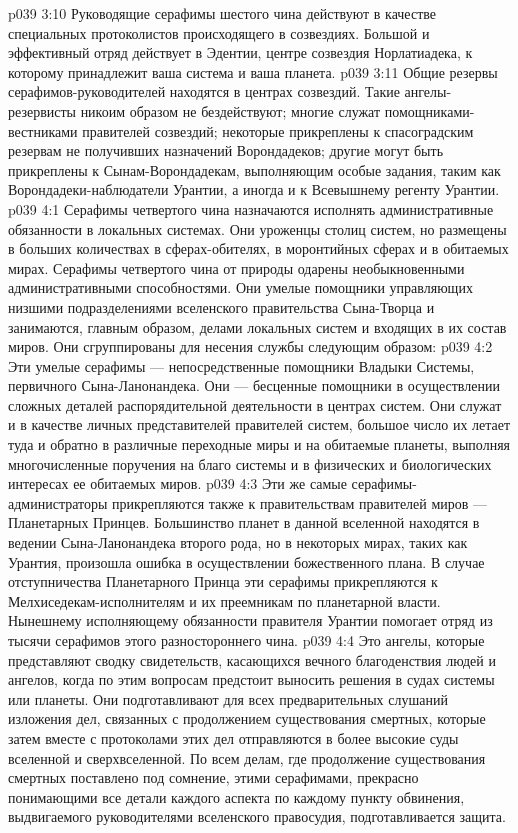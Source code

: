 \vs p039 3:10 \bibnobreakspace {} Руководящие серафимы шестого чина действуют в качестве специальных протоколистов происходящего в созвездиях. Большой и эффективный отряд действует в Эдентии, центре созвездия Норлатиадека, к которому принадлежит ваша система и ваша планета.
\vs p039 3:11 \bibnobreakspace {} Общие резервы серафимов\hyp{}руководителей находятся в центрах созвездий. Такие ангелы\hyp{}резервисты никоим образом не бездействуют; многие служат помощниками\hyp{}вестниками правителей созвездий; некоторые прикреплены к спасоградским резервам не получивших назначений Ворондадеков; другие могут быть прикреплены к Сынам\hyp{}Ворондадекам, выполняющим особые задания, таким как Ворондадеки\hyp{}наблюдатели Урантии, а иногда и к Всевышнему регенту Урантии.
\vs p039 4:1 Серафимы четвертого чина назначаются исполнять административные обязанности в локальных системах. Они уроженцы столиц систем, но размещены в больших количествах в сферах\hyp{}обителях, в моронтийных сферах и в обитаемых мирах. Серафимы четвертого чина от природы одарены необыкновенными административными способностями. Они умелые помощники управляющих низшими подразделениями вселенского правительства Сына\hyp{}Творца и занимаются, главным образом, делами локальных систем и входящих в их состав миров. Они сгруппированы для несения службы следующим образом:
\vs p039 4:2 \bibnobreakspace {} Эти умелые серафимы --- непосредственные помощники Владыки Системы, первичного Сына\hyp{}Ланонандека. Они --- бесценные помощники в осуществлении сложных деталей распорядительной деятельности в центрах систем. Они служат и в качестве личных представителей правителей систем, большое число их летает туда и обратно в различные переходные миры и на обитаемые планеты, выполняя многочисленные поручения на благо системы и в физических и биологических интересах ее обитаемых миров.
\vs p039 4:3 Эти же самые серафимы\hyp{}администраторы прикрепляются также к правительствам правителей миров --- Планетарных Принцев. Большинство планет в данной вселенной находятся в ведении Сына\hyp{}Ланонандека второго рода, но в некоторых мирах, таких как Урантия, произошла ошибка в осуществлении божественного плана. В случае отступничества Планетарного Принца эти серафимы прикрепляются к Мелхиседекам\hyp{}исполнителям и их преемникам по планетарной власти. Нынешнему исполняющему обязанности правителя Урантии помогает отряд из тысячи серафимов этого разностороннего чина.
\vs p039 4:4 \bibnobreakspace {} Это ангелы, которые представляют сводку свидетельств, касающихся вечного благоденствия людей и ангелов, когда по этим вопросам предстоит выносить решения в судах системы или планеты. Они подготавливают для всех предварительных слушаний изложения дел, связанных с продолжением существования смертных, которые затем вместе с протоколами этих дел отправляются в более высокие суды вселенной и сверхвселенной. По всем делам, где продолжение существования смертных поставлено под сомнение, этими серафимами, прекрасно понимающими все детали каждого аспекта по каждому пункту обвинения, выдвигаемого руководителями вселенского правосудия, подготавливается защита.
